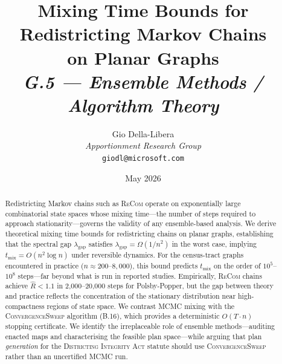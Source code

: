 \documentclass[12pt]{article}
\title{%
  \textbf{Mixing Time Bounds for Redistricting Markov Chains}\\
  \textbf{on Planar Graphs}\\[0.8em]
  \normalsize\textit{G.5 --- Ensemble Methods / Algorithm Theory}%
}
\author{%
  Gio Della-Libera\\
  \textit{Apportionment Research Group}\\
  \small\texttt{giodl@microsoft.com}
}
\date{May 2026}
\newcommand{\recom}{\textsc{ReCom}}
\newcommand{\cs}{\textsc{ConvergenceSweep}}
\newcommand{\dia}{\textsc{Districting Integrity Act}}
\newcommand{\tmix}{\ensuremath{t_{\mathrm{mix}}}}
\newcommand{\sgap}{\ensuremath{\lambda_{\mathrm{gap}}}}
\newcommand{\rhat}{\ensuremath{\hat{R}}}
\begin{document}
\maketitle

\begin{abstract}
\noindent
Redistricting Markov chains such as \recom{} operate on exponentially
large combinatorial state spaces whose mixing time---the number of
steps required to approach stationarity---governs the validity of any
ensemble-based analysis.
We derive theoretical mixing time bounds for redistricting chains on
planar graphs, establishing that the spectral gap $\sgap$ satisfies
$\sgap = \Omega(1/n^2)$ in the worst case, implying $\tmix = O(n^2
\log n)$ under reversible dynamics.
For the census-tract graphs encountered in practice ($n \approx 200$--$8{,}000$),
this bound predicts $\tmix$ on the order of $10^5$--$10^8$ steps---far
beyond what is run in reported studies.
Empirically, \recom{} chains achieve $\rhat < 1.1$ in 2{,}000--20{,}000
steps for Polsby-Popper, but the gap between theory and practice reflects
the concentration of the stationary distribution near high-compactness
regions of state space.
We contrast MCMC mixing with the \cs{} algorithm (B.16), which provides
a deterministic $O(T \cdot n)$ stopping certificate.
We identify the irreplaceable role of ensemble methods---auditing enacted
maps and characterising the feasible plan space---while arguing that plan
\emph{generation} for the \dia{} statute should use \cs{} rather than
an uncertified MCMC run.
\end{abstract}

\tableofcontents
\newpage











\end{document}
